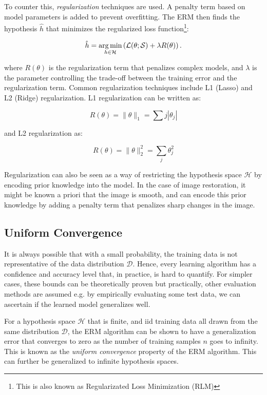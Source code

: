 To counter this, \textit{regularization} techniques are used. A penalty term based on model parameters is added to prevent overfitting. The \gls{ERM} then finds the hypothesis $\hat{h}$ that minimizes the regularized loss function\footnote{This is also known as Regularizated Loss Minimization (RLM)}:

\begin{equation}
    \hat{h} = \operatorname*{arg\,min}_{h \in \mathcal{H}} \left(\mathcal{L}(\theta; \mathcal{S})  + \lambda R(\theta) \right).
\end{equation}

where $R(\theta)$ is the regularization term that penalizes complex models, and $\lambda$ is the parameter controlling the trade-off between the training error and the regularization term. Common regularization techniques include L1 (Lasso) and L2 (Ridge) regularization. L1 regularization can be written as:

\begin{equation*}
    R(\theta) = \|\theta\|_1 = \sum{j} |\theta_j|
\end{equation*}

and L2 regularization as:

\begin{equation*}
    R(\theta) = \|\theta\|^2_2 = \sum_{j} \theta_j^2
\end{equation*}

Regularization can also be seen as a way of restricting the hypothesis space $\mathcal{H}$ by encoding prior knowledge into the model. In the case of image restoration, it might be known a priori that the image is smooth, and  can encode this prior knowledge by adding a penalty term that penalizes sharp changes in the image.


\subsection{Uniform Convergence}
It is always possible that with a small probability, the training data is not representative of the data distribution $\mathcal{D}$. Hence, every learning algorithm has a confidence and accuracy level that, in practice, is hard to quantify. For simpler cases, these bounds can be theoretically proven but practically, other evaluation methods are assumed e.g. by empirically evaluating some test data, we can ascertain if the learned model generalizes well.

For a hypothesis space $\mathcal{H}$ that is finite, and \gls{iid} training data all drawn from the same distribution $\mathcal{D}$, the \gls{ERM} algorithm can be shown to have a generalization error that converges to zero as the number of training samples $n$ goes to infinity. This is known as the \textit{uniform convergence} property of the \gls{ERM} algorithm. This can further be generalized to infinite hypothesis spaces.


